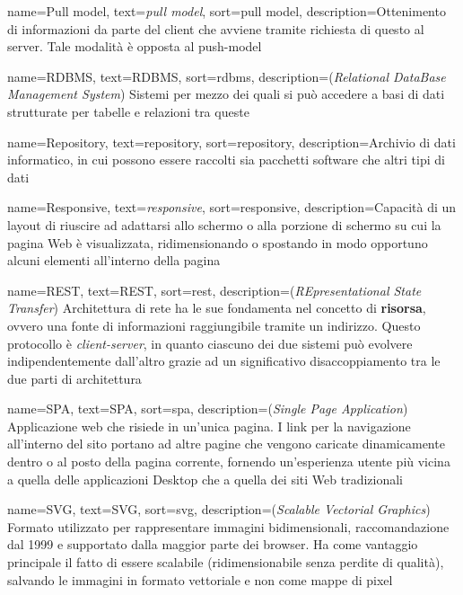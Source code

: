 {
    name={Pull model},
    text=\emph{pull model},
    sort=pull model,
    description={Ottenimento di informazioni da parte del client che avviene
    tramite richiesta di questo al server. Tale modalità è opposta al
    \gls{push-model}}
}

{
    name={RDBMS},
    text=RDBMS,
    sort=rdbms,
    description={(\emph{Relational DataBase Management System}) Sistemi per mezzo dei quali si può accedere a basi di dati strutturate per tabelle e relazioni tra queste}
}

{
    name={Repository},
    text=repository,
    sort=repository,
    description={Archivio di dati informatico, in cui possono essere raccolti sia pacchetti software che altri tipi di dati}
}

{
    name={Responsive},
    text=\emph{responsive},
    sort=responsive,
    description={Capacità di un layout di riuscire ad adattarsi allo schermo o alla porzione di schermo su cui la pagina Web è visualizzata, ridimensionando o spostando in modo opportuno alcuni elementi all'interno della pagina}
}

{
    name={REST},
    text=REST,
    sort=rest,
    description={(\emph{REpresentational State Transfer}) Architettura di rete ha le sue fondamenta nel concetto di \textbf{risorsa}, ovvero una fonte di informazioni raggiungibile tramite un indirizzo. Questo protocollo è \emph{client-server}, in quanto ciascuno dei due sistemi può evolvere indipendentemente dall'altro grazie ad un significativo disaccoppiamento tra le due parti di architettura}
}

{
    name={SPA},
    text=SPA,
    sort=spa,
    description={(\emph{Single Page Application}) Applicazione web che risiede in un'unica pagina. I link per la navigazione all'interno del sito portano ad altre pagine che vengono caricate dinamicamente dentro o al posto della pagina corrente, fornendo un'esperienza utente più vicina a quella delle applicazioni Desktop che a quella dei siti Web tradizionali}
}

{
    name={SVG},
    text=SVG,
    sort=svg,
    description={(\emph{Scalable Vectorial Graphics}) Formato utilizzato per rappresentare immagini bidimensionali, raccomandazione  dal 1999 e supportato dalla maggior parte dei browser. Ha come vantaggio principale il fatto di essere scalabile (ridimensionabile senza perdite di qualità), salvando le immagini in formato vettoriale e non come mappe di pixel}
}

